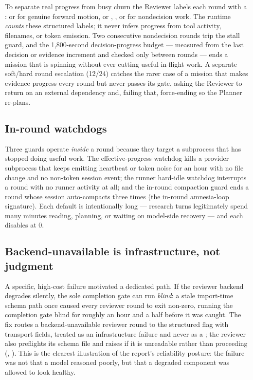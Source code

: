 To separate real progress from busy churn the Reviewer labels each round with a
:  or  for genuine forward
motion, or , , or  for
nondecision work. The runtime \emph{counts} these structured labels; it never
infers progress from tool activity, filenames, or token emission. Two consecutive
nondecision rounds trip the stall guard, and the 1{,}800-second decision-progress
budget --- measured from the last decision or evidence increment and checked only
between rounds --- ends a mission that is spinning without ever cutting useful
in-flight work. A separate soft/hard round escalation (12/24) catches the rarer
case of a mission that makes evidence progress every round but never passes its
gate, asking the Reviewer to return  on an external dependency and,
failing that, force-ending so the Planner re-plans.

\subsection{In-round watchdogs}

Three guards operate \emph{inside} a round because they target a subprocess that
has stopped doing useful work. The effective-progress watchdog kills a provider
subprocess that keeps emitting heartbeat or token noise for an hour with no file
change and no non-token session event; the runner hard-idle watchdog interrupts a
round with no runner activity at all; and the in-round compaction guard ends a
round whose session auto-compacts three times (the in-round amnesia-loop
signature). Each default is intentionally long --- research turns legitimately spend
many minutes reading, planning, or waiting on model-side recovery --- and each
disables at 0.

\subsection{Backend-unavailable is infrastructure, not judgment}

A specific, high-cost failure motivated a dedicated path. If the reviewer backend
degrades silently, the sole completion gate can run \emph{blind}: a stale
import-time schema path once caused every reviewer round to exit non-zero, running
the completion gate blind for roughly an hour and a half before it was caught. The
fix routes a backend-unavailable reviewer round to the structured
 flag with transport fields, treated as an
infrastructure failure and never as a ; the reviewer also preflights
its schema file and raises if it is unreadable rather than proceeding
(, ). This is the clearest
illustration of the report's reliability posture: the failure was not that a model
reasoned poorly, but that a degraded component was allowed to look healthy.

